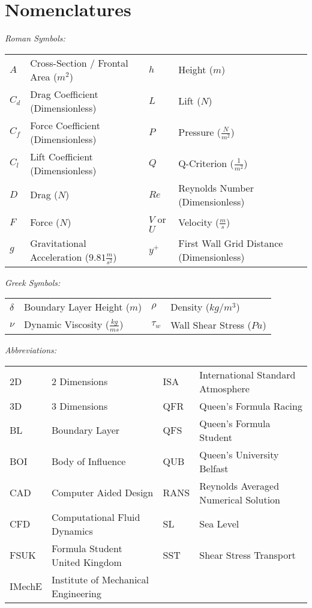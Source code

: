 \newpage
\thispagestyle{empty}
\section*{Nomenclatures} 
\flushleft
\begin{doublespace}
\textit{Roman Symbols:}

\begin{tabular}{l l  l l }
$A$ & Cross-Section / Frontal Area ($m^2$) & $h$ & Height ($m$) \\
$C_d$ & Drag Coefficient (Dimensionless) & $L$ & Lift ($N$)\\
$C_f$ & Force Coefficient (Dimensionless)  & $P$ & Pressure ($\frac{N}{m^2}$)\\
$C_l$ & Lift Coefficient (Dimensionless) & $Q$ & Q-Criterion ($\frac{1}{m^2}$) \\
$D$ & Drag ($N$) & $Re$ & Reynolds Number (Dimensionless) \\
$F$ & Force ($N$)  & $V$ or $U$ & Velocity ($\frac{m}{s}$)\\
$g$ & Gravitational Acceleration ($9.81\frac{m}{s^2}$) & $y^+$ & First Wall Grid Distance (Dimensionless) \\

\end{tabular}

\textit{Greek Symbols:}

\begin{tabular}{llll}
$\delta$ & Boundary Layer Height ($m$) & $\rho$ & Density ($kg/m^3$) \\
$\nu$ & Dynamic Viscosity ($\frac{kg}{ms}$) & $\tau_w$ & Wall Shear Stress ($Pa$) \\
\end{tabular}


\textit{Abbreviations:}

\begin{tabular}{llll}
2D & 2 Dimensions & ISA & International Standard Atmosphere\\
3D & 3 Dimensions & QFR & Queen's Formula Racing\\
BL & Boundary Layer & QFS & Queen's Formula Student\\
BOI & Body of Influence & QUB & Queen's University Belfast\\
CAD & Computer Aided Design & RANS & Reynolds Averaged Numerical Solution\\
CFD & Computational Fluid Dynamics & SL & Sea Level\\
FSUK & Formula Student United Kingdom & SST & Shear Stress Transport\\
IMechE & Institute of Mechanical Engineering  & \\
\end{tabular}

\end{doublespace}